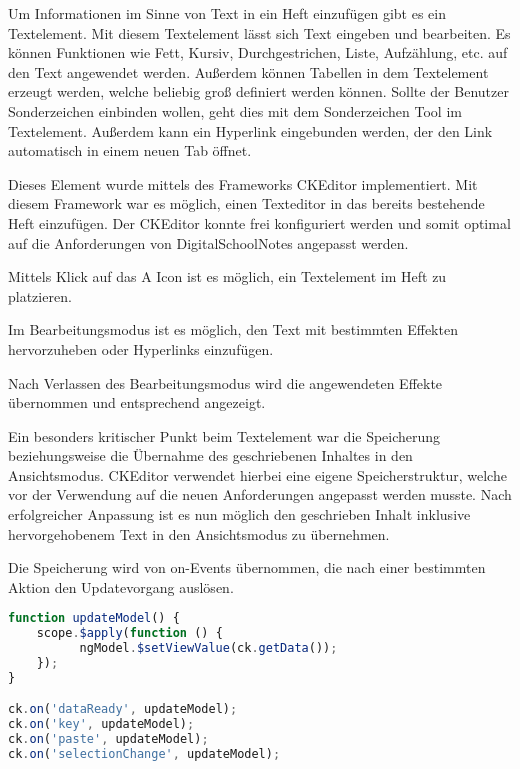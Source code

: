 Um Informationen im Sinne von Text in ein Heft einzufügen gibt es ein Textelement. Mit diesem Textelement lässt sich Text eingeben und bearbeiten. Es können Funktionen wie Fett, Kursiv, Durchgestrichen, Liste, Aufzählung, etc. auf den Text angewendet werden. Außerdem können Tabellen in dem Textelement erzeugt werden, welche beliebig groß definiert werden können. Sollte der Benutzer Sonderzeichen einbinden wollen, geht dies mit dem Sonderzeichen Tool im Textelement. Außerdem kann ein Hyperlink eingebunden werden, der den Link automatisch in einem neuen Tab öffnet.

Dieses Element wurde mittels des Frameworks CKEditor implementiert. Mit diesem Framework war es möglich, einen Texteditor in das bereits bestehende Heft einzufügen. Der CKEditor konnte frei konfiguriert werden und somit optimal auf die Anforderungen von DigitalSchoolNotes angepasst werden.

Mittels Klick auf das A Icon ist es möglich, ein Textelement im Heft zu platzieren.

Im Bearbeitungsmodus ist es möglich, den Text mit bestimmten Effekten hervorzuheben oder Hyperlinks einzufügen.

Nach Verlassen des Bearbeitungsmodus wird die angewendeten Effekte übernommen und entsprechend angezeigt.

Ein besonders kritischer Punkt beim Textelement war die Speicherung beziehungsweise die Übernahme des geschriebenen Inhaltes in den Ansichtsmodus. CKEditor verwendet hierbei eine eigene Speicherstruktur, welche vor der Verwendung auf die neuen Anforderungen angepasst werden musste. Nach erfolgreicher Anpassung ist es nun möglich den geschrieben Inhalt inklusive hervorgehobenem Text in den Ansichtsmodus zu übernehmen.

Die Speicherung wird von on-Events übernommen, die nach einer bestimmten Aktion den Updatevorgang auslösen.
\begin{lstlisting}[caption={Speicherung des Textelements}, language=Javascript]
function updateModel() {
	scope.$apply(function () {
          ngModel.$setViewValue(ck.getData());
    });
}

ck.on('dataReady', updateModel);
ck.on('key', updateModel);
ck.on('paste', updateModel);
ck.on('selectionChange', updateModel);
\end{lstlisting}


